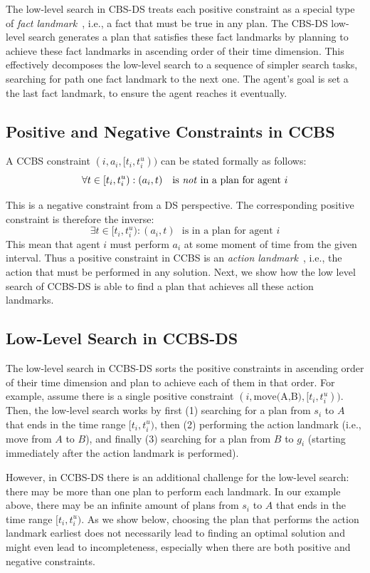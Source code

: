 \documentclass[letterpaper]{article} %
\newcommand{\ccbs}{\ac{CCBS}\xspace}
\newcommand{\ccbsds}{\ac{CCBS-DS}\xspace}
\newcommand{\cbsds}{{CBS-DS}\xspace}
\newcommand{\ds}{\ac{DS}\xspace}
\begin{document}
The low-level search in \cbsds 
treats each positive constraint as a special type of \emph{fact landmark}~\cite{richter2008landmarks}, i.e., a fact that must be true in any plan.
The \cbsds low-level search generates a plan that satisfies these fact landmarks by 
planning to achieve these fact landmarks in ascending order of their time dimension. 
This effectively decomposes the low-level search to a sequence of simpler search tasks, searching for path one fact landmark to the next one. 
The agent's goal is set a the last fact landmark, to ensure the agent reaches it eventually. 


\subsection{Positive and Negative Constraints in \ccbs}


A \ccbs constraint $(i, a_i, [t_i, t_i^u))$ can be stated formally as follows:
\[
\forall t\in [t_i, t_i^u): (a_i, t) ~~~ \text{is \emph{not} in a plan for agent $i$}
\]

This is a negative constraint from a \ds perspective. The corresponding positive constraint is therefore the inverse: 
\[
\exists t\in [t_i, t_i^u): (a_i, t) ~~~ \text{is in a plan for agent $i$}
\]
This mean that agent $i$ must perform $a_i$ at some moment of time from the given interval. Thus a positive constraint in \ccbs is an \emph{action landmark}~\cite{karpas2009cost}, i.e., the action that must be performed in any solution. Next, we show how the low level search of \ccbsds is able to find a plan that achieves all these action landmarks. 

\subsection{Low-Level Search in \ccbsds}

The low-level search in \ccbsds sorts the positive constraints in ascending order of their time dimension and plan to achieve each of them in that order. 
For example, assume there is a single positive constraint $(i, \text{move(A,B)}, [t_i, t_i^u))$.  
Then, the low-level search works by first 
(1) searching for a plan from $s_i$ to $A$ that ends in the time range $[t_i, t_i^u)$, 
then (2) performing the action landmark (i.e., move from $A$ to $B$),
and finally (3) searching for a plan from $B$ to $g_i$ (starting immediately after the action landmark is performed). 

However, in \ccbsds there is an additional challenge for the low-level search: there may be more than one plan to perform each landmark. 
In our example above, there may be an infinite amount of plans from $s_i$ to $A$  that ends in the time range $[t_i, t_i^u)$. 
As we show below, choosing the plan that performs the action landmark earliest does not necessarily lead to finding an optimal solution and might even lead to incompleteness, especially when there are both positive and negative constraints. 
\end{document}
